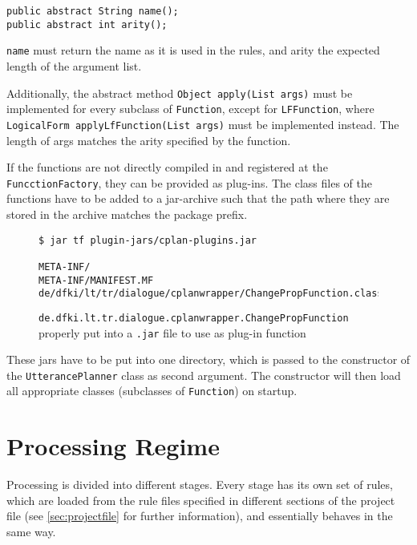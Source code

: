 \documentclass[11pt,a4paper]{article}
\begin{document}
\begin{verbatim}
public abstract String name();
public abstract int arity();
\end{verbatim}

\texttt{name} must return the name as it is used in the rules, and arity the
expected length of the argument list.

Additionally, the abstract method \verb|Object apply(List args)| must be
implemented for every subclass of \texttt{Function}, except for
\texttt{LFFunction}, where \verb|LogicalForm applyLfFunction(List args)|
must be implemented instead. The length of args matches the arity specified by
the function.

If the functions are not directly compiled in and registered at the
\texttt{FuncctionFactory}, they can be provided as plug-ins. The class files
of the functions have to be added to a jar-archive such that the path where
they are stored in the archive matches the package prefix.

\begin{figure}[htbp]
\begin{verbatim}
$ jar tf plugin-jars/cplan-plugins.jar

META-INF/
META-INF/MANIFEST.MF
de/dfki/lt/tr/dialogue/cplanwrapper/ChangePropFunction.class
\end{verbatim}
\caption{\texttt{de.dfki.lt.tr.dialogue.cplanwrapper.ChangePropFunction}
  properly put into a \texttt{.jar} file to use as plug-in function }
\end{figure}

These jars have to be put into one directory, which is passed to the
constructor of the \texttt{UtterancePlanner} class as second argument. The
constructor will then load all appropriate classes (subclasses of
\texttt{Function}) on startup.


\section{Processing Regime\label{sec:procregime}}

Processing is divided into different stages. Every stage has its own set of
rules, which are loaded from the rule files specified in different sections of
the project file (see \ref{sec:projectfile} for further information), and
essentially behaves in the same way.
\end{document}
